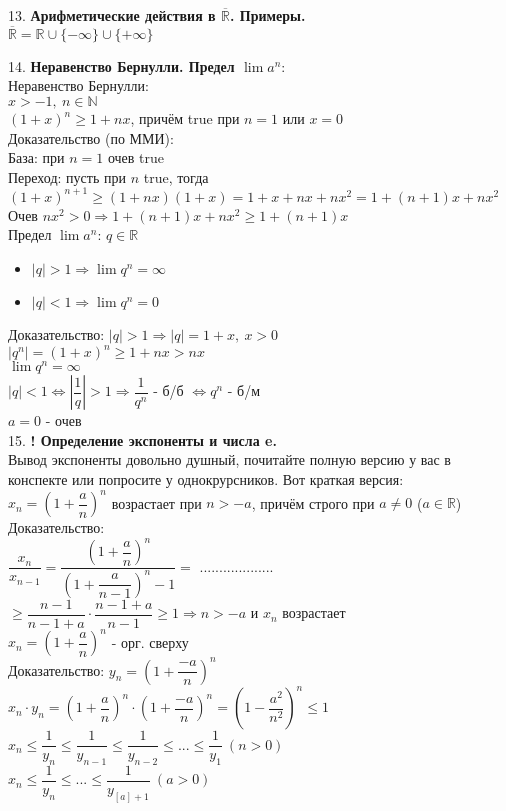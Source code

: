 \documentclass[12pt]{article}
\begin{document}
13. \textbf{Арифметические действия в $\overline{\mathbb{R}}$. Примеры.}\\
$\overline{\mathbb{R}} = \mathbb{R}\cup\{-\infty\}\cup\{+\infty\}$

14. \textbf{Неравенство Бернулли. Предел $\lim a^n$}:\\
Неравенство Бернулли:\\
$x > -1,\ n \in \mathbb{N}$\\
$(1 + x)^n \ge 1 + nx$, причём true при $n = 1$ или $x = 0$\\
Доказательство (по ММИ):\\
База: при $n = 1$ очев true\\
Переход: пусть при $n$ true, тогда $(1 + x)^{n+1} \ge (1 + nx)(1 + x) = 1 + x + nx + nx^2 = 1 + (n + 1)x + nx^2$\\
Очев $nx^2 > 0 \Rightarrow 1 + (n + 1)x + nx^2 \ge 1 + (n + 1)x$\\

Предел $\lim a^n$: $q \in \mathbb{R}$
\begin{itemize}
    \item $|q| > 1 \Rightarrow \lim q^n = \infty$
    \item $|q| < 1 \Rightarrow \lim q^n = 0$
\end{itemize}
Доказательство: $|q| > 1 \Rightarrow |q| = 1 + x,\ x > 0$\\
$|q^n| = (1 + x)^n \ge 1 + nx > nx$\\
$\lim q^n = \infty$\\
$|q| < 1 \Leftrightarrow |\dfrac{1}{q}| > 1 \Rightarrow \dfrac{1}{q^n}$ - б/б $\Leftrightarrow q^n$ - б/м\\
$a = 0$ - очев\\

15. \textbf{! Определение экспоненты и числа e.}\\
Вывод экспоненты довольно душный, почитайте полную версию у вас в конспекте или попросите у однокрурсников. Вот краткая версия:\\
$x_n = (1 + \dfrac{a}{n})^n$ возрастает при $n > -a$, причём строго при $a \ne 0$ ($a \in \mathbb{R}$)\\
Доказательство:\\
$\dfrac{x_n}{x_{n-1}} = \dfrac{(1 + \dfrac{a}{n})^n}{(1 + \dfrac{a}{n-1})^n-1} =$ ................... $\ge \dfrac{n - 1}{n - 1 + a} \cdot \dfrac{n - 1 + a}{n-1} \ge 1 \Rightarrow n > -a$ и $x_n$ возрастает\\

$x_n = (1 + \dfrac{a}{n})^n$ - орг. сверху\\
Доказательство: $y_n = (1 + \dfrac{-a}{n})^n$\\
$x_n \cdot y_n = (1 + \dfrac{a}{n})^n \cdot (1 + \dfrac{-a}{n})^n = (1 - \dfrac{a^2}{n^2})^n \le 1$\\
$x_n \le \dfrac{1}{y_n} \le \dfrac{1}{y_{n-1}} \le \dfrac{1}{y_{n-2}} \le ... \le \dfrac{1}{y_1}\ (n > 0)$\\
$x_n \le \dfrac{1}{y_n} \le ... \le \dfrac{1}{y_{[a]+1}}\ (a > 0)$\\
\end{document}
